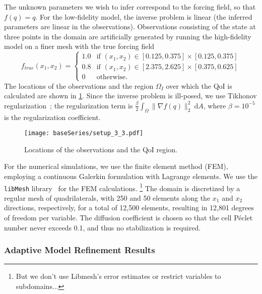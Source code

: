 The unknown parameters we wish to infer correspond to the forcing field, so that $f(q)=q$. For the low-fidelity model, the inverse problem is linear (the inferred parameters are linear in the observations). Observations consisting of the state at three points in the domain are artificially generated by running the high-fidelity model on a finer mesh with the true forcing field
%
\begin{equation}
f_{true}(x_1,x_2)=
\begin{cases}
1.0 & \textrm{if }(x_1,x_2)\in[0.125,0.375]\times[0.125,0.375] \\
0.8 & \textrm{if }(x_1,x_2)\in[2.375,2.625]\times[0.375,0.625] \\
0 & \textrm{otherwise}.
\end{cases}
\end{equation}
%
The locations of the observations and the region $\Omega_I$ over which the QoI is calculated are shown in \cref{fig:baseSetup}. Since the inverse problem is ill-posed, we use Tikhonov regularization~\cite{EngHanNeu00}; the regularization term is $\frac{\beta}{2}\int_\Omega \|\nabla f(q)\|_2^2\:\textrm{d}A$, where $\beta=10^{-5}$ is the regularization coefficient. 
%
\begin{figure}[htbp]
\centering
\texttt{[image: baseSeries/setup\_3\_3.pdf]}
\caption{Locations of the observations and the QoI region.}
\label{fig:baseSetup}
\end{figure}
%

For the numerical simulations, we use the finite element method (FEM), employing a continuous Galerkin formulation with Lagrange elements. We use the \texttt{libMesh} library~\cite{libMeshPaper} for the FEM calculations. \footnote{But we don't use Libmesh's error estimates or restrict variables to subdomains...} The domain is discretized by a regular mesh of quadrilaterals, with 250 and 50 elements along the $x_1$ and $x_2$ directions, respectively, for a total of 12,500 elements, resulting in 12,801 degrees of freedom per variable. The diffusion coefficient is chosen so that the cell P\'{e}clet number never exceeds 0.1, and thus no stabilization is required.
%
\subsubsection{Adaptive Model Refinement Results} \label{sec:cdvcdrBaseRef} 
%

